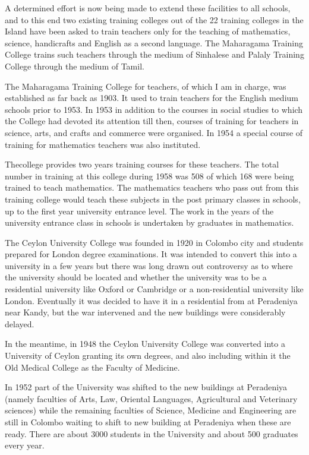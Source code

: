 A determined effort is now being made to extend these facilities to all schools, and to this end two existing training colleges out of the 22 training colleges in the Island have been asked to train teachers only for the teaching of mathematics, science, handicrafts and English as a second language. The Maharagama Training College trains such teachers through the medium of Sinhalese and Palaly Training College through the medium of Tamil.

The Maharagama Training College for teachers, of which I am in charge, was established as far back as 1903. It used to train teachers for the English medium schools prior to 1953. In 1953 in addition to the courses in social studies to which the College had devoted its attention till then, courses of training for teachers in science, arts, and crafts and commerce were organised. In 1954 a special course of training for mathematics teachers was also instituted.

The\pageoriginale college provides two years training courses for these teachers. The total number in training at this college during 1958 was 508 of which 168 were being trained to teach mathematics. The mathematics teachers who pass out from this training college would teach these subjects in the post primary classes in schools, up to the first year university entrance level. The work in the years of the university entrance class in schools is undertaken by graduates in mathematics.

The Ceylon University College was founded in 1920 in Colombo city and students prepared for London degree examinations. It was intended to convert this into a university in a few years but there was long drawn out controversy as to where the university should be located and whether the university was to be a residential university like Oxford or Cambridge or a non-residential university like London. Eventually it was decided to have it in a residential from at Peradeniya near Kandy, but the war intervened and the new buildings were considerably delayed.

In the meantime, in 1948 the Ceylon University College was converted into a University of Ceylon granting its own degrees, and also including within it the Old Medical College as the Faculty of Medicine.

In 1952 part of the University was shifted to the new buildings at Peradeniya (namely faculties of Arts, Law, Oriental Languages, Agricultural and Veterinary sciences) while the remaining faculties of Science, Medicine and Engineering are still in Colombo waiting to shift to new building at Peradeniya when these are ready. There are about 3000 students in the University and about 500 graduates every year.

